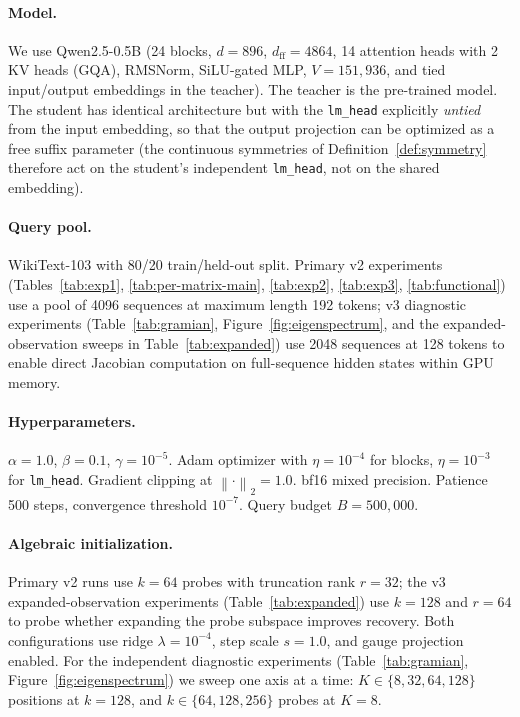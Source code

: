 \documentclass{article}
\newcommand{\norm}[1]{\left\lVert #1 \right\rVert}
\begin{document}
\paragraph{Model.} We use Qwen2.5-0.5B (24 blocks, $d=896$, $d_\text{ff}=4864$, 14 attention heads with 2 KV heads (GQA), RMSNorm, SiLU-gated MLP, $V=151{,}936$, and tied input/output embeddings in the teacher). The teacher is the pre-trained model. The student has identical architecture but with the \texttt{lm\_head} explicitly \emph{untied} from the input embedding, so that the output projection can be optimized as a free suffix parameter (the continuous symmetries of Definition~\ref{def:symmetry} therefore act on the student's independent \texttt{lm\_head}, not on the shared embedding).

\paragraph{Query pool.} WikiText-103 \citep{merity2016pointer} with 80/20 train/held-out split. Primary v2 experiments (Tables~\ref{tab:exp1}, \ref{tab:per-matrix-main}, \ref{tab:exp2}, \ref{tab:exp3}, \ref{tab:functional}) use a pool of 4096 sequences at maximum length 192 tokens; v3 diagnostic experiments (Table~\ref{tab:gramian}, Figure~\ref{fig:eigenspectrum}, and the expanded-observation sweeps in Table~\ref{tab:expanded}) use 2048 sequences at 128 tokens to enable direct Jacobian computation on full-sequence hidden states within GPU memory.

\paragraph{Hyperparameters.} $\alpha = 1.0$, $\beta = 0.1$, $\gamma = 10^{-5}$. Adam optimizer with $\eta = 10^{-4}$ for blocks, $\eta = 10^{-3}$ for \texttt{lm\_head}. Gradient clipping at $\norm{\cdot}_2 = 1.0$. bf16 mixed precision. Patience 500 steps, convergence threshold $10^{-7}$. Query budget $B = 500{,}000$.

\paragraph{Algebraic initialization.} Primary v2 runs use $k = 64$ probes with truncation rank $r = 32$; the v3 expanded-observation experiments (Table~\ref{tab:expanded}) use $k = 128$ and $r = 64$ to probe whether expanding the probe subspace improves recovery.  Both configurations use ridge $\lambda = 10^{-4}$, step scale $s = 1.0$, and gauge projection enabled.  For the independent diagnostic experiments (Table~\ref{tab:gramian}, Figure~\ref{fig:eigenspectrum}) we sweep one axis at a time: $K \in \{8, 32, 64, 128\}$ positions at $k{=}128$, and $k \in \{64, 128, 256\}$ probes at $K{=}8$.
\end{document}
